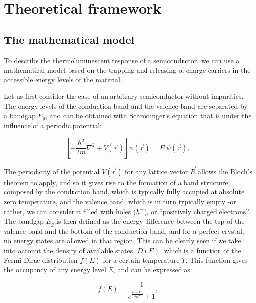 \chapter{Theoretical framework}\label{ch:3}


\section{The mathematical model} \label{sec:modelo}

To describe the thermoluminescent response of a semiconductor, we can use a mathematical model based on the trapping and releasing of charge carriers in the accessible energy levels of the material. 

\vspace{10pt}

Let us first consider the case of an arbitrary semiconductor without impurities. The energy levels of the conduction band and the valence band are separated by a bandgap $E_g$, and can be obtained with Schrodinger's equation that is under the influence of a periodic potential:

\begin{equation} \label{eq:schrodinger}
  \left[ -\frac{\hbar^2}{2m} \nabla^2 + V(\vec{r}) \right] \psi(\vec{r}) = E ~ \psi(\vec{r}),
\end{equation}

\vspace{10pt}
The periodicity of the potential $V(\vec{r})$ for any lattice vector $\vec{R}$ allows the Bloch's theorem to apply, and so it gives rise to the formation of a band structure, composed by the conduction band, which is typically fully occupied at absolute zero temperature, and the valence band, which is in turn typically empty -or rather, we can consider it filled with holes ($h^+$), or ``positively charged electrons''. The bandgap $E_g$ is then defined as the energy difference between the top of the valence band and the bottom of the conduction band, and for a perfect crystal, no energy states are allowed in that region. This can be clearly seen if we take into account the density of available states, $D(E)$, which is a function of the Fermi-Dirac distribution $f(E)$ for a certain temperature $T$. This function gives the occupancy of any energy level $E$, and can be expressed as:

\begin{equation} \label{eq:fermidirac}
  f(E) = \frac{1}{e^{\frac{E - E_f}{k_B T}} + 1},
\end{equation}

